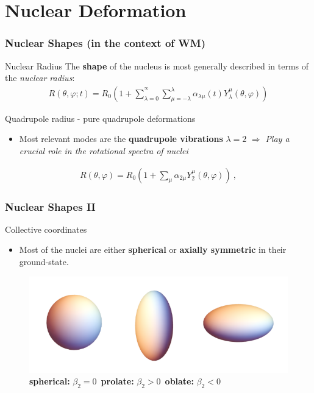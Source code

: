 \documentclass[
	11pt, %
]{beamer}
\begin{document}
		
\section{Nuclear Deformation}

\begin{frame}
	\frametitle{Nuclear Shapes (in the context of WM)}
	\begin{exampleblock}{Nuclear Radius}
		The \textbf{shape} of the nucleus is most generally described in terms of the \emph{nuclear radius}:
		\begin{align}
			R(\theta,\varphi;t)=R_0\left(1+\sum_{\lambda=0}^{^\infty}\sum_{\mu=-\lambda}^\lambda\alpha_{\lambda\mu}(t)Y_\lambda^\mu(\theta,\varphi)\right)
		\end{align}
	\end{exampleblock}
	\begin{block}{Quadrupole radius - pure quadrupole deformations}

		\begin{itemize}
			\item Most relevant modes are the \textbf{quadrupole vibrations} $\lambda=2$ $\Longrightarrow$ \emph{Play a crucial role in the rotational spectra of nuclei}
		\end{itemize}
		\begin{align}
			R(\theta,\varphi)=R_0\left(1+\sum_\mu\alpha_{2\mu}Y_2^\mu(\theta,\varphi)\right)\ ,
		\end{align}
	\end{block}
\end{frame}

\begin{frame}
	\frametitle{Nuclear Shapes II}
	\begin{block}{Collective coordinates}
		\begin{itemize}
			\item Most of the nuclei are either \textbf{spherical} or \textbf{axially symmetric} in their ground-state.
		\end{itemize}
	\end{block}
	\begin{figure}
		\centering
		\includegraphics[scale=0.38]{figures/nuclear_shapes.png}
		\caption{\textbf{spherical:} $\beta_2=0$\ \textbf{prolate:} $\beta_2>0$\ \textbf{oblate:} $\beta_2<0$}
	\end{figure}
\end{frame}
\end{document}
